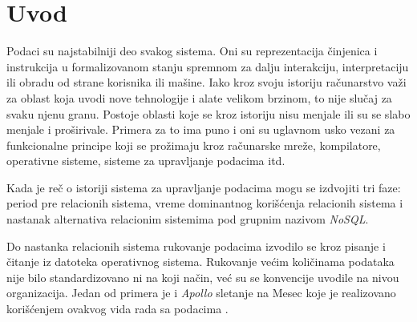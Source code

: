 \documentclass[12pt,oneside]{memoir}
\begin{document}
\frontmatter
\naslovna
\komisija
\apstrakt
\tableofcontents*

\mainmatter

\chapter{Uvod}

Podaci su najstabilniji deo svakog sistema. Oni su reprezentacija činjenica i instrukcija u formalizovanom stanju spremnom za dalju interakciju, interpretaciju ili obradu od strane korisnika ili mašine. Iako kroz svoju istoriju računarstvo važi za oblast koja uvodi nove tehnologije i alate velikom brzinom, to nije slučaj za svaku njenu granu. Postoje oblasti koje se kroz istoriju nisu menjale ili su se slabo menjale i proširivale. Primera za to ima puno i oni su uglavnom usko vezani za funkcionalne principe koji se prožimaju kroz računarske mreže, kompilatore, operativne sisteme, sisteme za upravljanje podacima itd. 

Kada je reč o istoriji sistema za upravljanje podacima mogu se izdvojiti tri faze: period pre relacionih sistema, vreme dominantnog korišćenja relacionih sistema i nastanak alternativa relacionim sistemima pod grupnim nazivom \textit{NoSQL}.

Do nastanka relacionih sistema rukovanje podacima izvodilo se kroz pisanje i čitanje iz datoteka operativnog sistema. Rukovanje većim količinama podataka nije bilo standardizovano ni na koji način, već su se konvencije uvodile na nivou organizacija.  Jedan od primera je i \textit{Apollo} sletanje na Mesec koje je realizovano korišćenjem ovakvog vida rada sa podacima \cite{ColumnarOriented}. 
\end{document}
